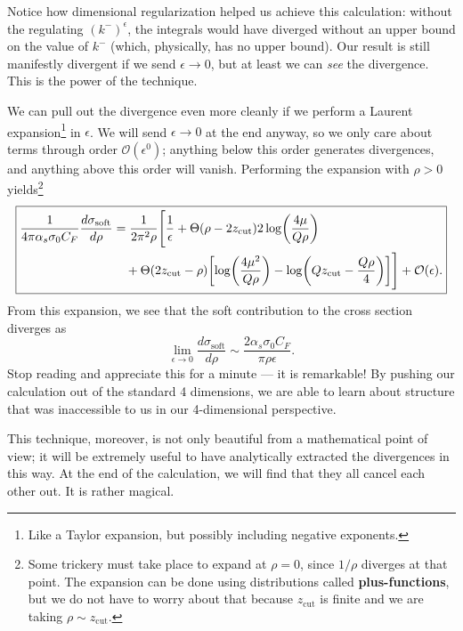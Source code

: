 \documentclass[../thesis.tex]{subfiles}
\providecommand{\zcut}{z_\mathrm{{cut}}}
\providecommand{\cO}{\mathcal{O}}
\begin{document}
	Notice how dimensional regularization helped us achieve this calculation: without the regulating $(k^-)^\epsilon$, the integrals would have diverged without an upper bound on the value of $k^-$ (which, physically, has no upper bound). Our result is still manifestly divergent if we send $\epsilon \to 0$, but at least we can \textit{see} the divergence. This is the power of the technique.

	We can pull out the divergence even more cleanly if we perform a Laurent expansion\footnote{Like a Taylor expansion, but possibly including negative exponents.} in $\epsilon$. We will send $\epsilon \to 0$ at the end anyway, so we only care about terms through order $\cO(\epsilon^0)$; anything below this order generates divergences, and anything above this order will vanish. Performing the expansion with $\rho > 0$ yields\footnote{Some trickery must take place to expand at $\rho = 0$, since $1/\rho$ diverges at that point. The expansion can be done using distributions called \textbf{plus-functions}, but we do not have to worry about that because $\zcut$ is finite and we are taking $\rho \sim \zcut$.}
	\begin{equation}\label{leading-eq:soft result}
	\boxed{
	\begin{aligned}
		\frac{1}{4\pi\alpha_s\sigma_0 C_F}\frac{d\sigma_{\text{soft}}}{d\rho} &= \frac{1}{2\pi^2\rho} \Bigg[\frac{1}{\epsilon} + \Theta(\rho - 2\zcut)2\log(\frac{4\mu}{Q\rho}) \\
			&\quad+ \Theta(2\zcut - \rho)\qty[\log(\frac{4\mu^2}{Q \rho}) - \log(Q \zcut - \frac{Q\rho}{4})]\Bigg] + \cO(\epsilon).
	\end{aligned}
	}
	\end{equation}
	From this expansion, we see that the soft contribution to the cross section diverges as
	\begin{equation}
		\lim_{\epsilon \to 0}\frac{d\sigma_\text{soft}}{d\rho} \sim \frac{2\alpha_s \sigma_0 C_F}{\pi\rho \epsilon}.
	\end{equation}
	Stop reading and appreciate this for a minute --- it is remarkable! By pushing our calculation out of the standard 4 dimensions, we are able to learn about structure that was inaccessible to us in our 4-dimensional perspective. 

	This technique, moreover, is not only beautiful from a mathematical point of view; it will be extremely useful to have analytically extracted the divergences in this way. At the end of the calculation, we will find that they all cancel each other out. It is rather magical.
\end{document}
